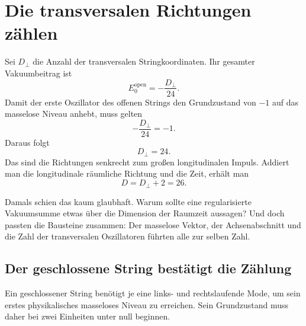 \section{Die transversalen Richtungen zählen}

Sei \(D_\perp\) die Anzahl der transversalen Stringkoordinaten. Ihr gesamter Vakuumbeitrag ist
\begin{equation}
  E_0^{\mathrm{open}}
  =-\frac{D_\perp}{24}.
  \label{eq:l05-open-vacuum}
\end{equation}
Damit der erste Oszillator des offenen Strings den Grundzustand von \(-1\) auf das masselose Niveau anhebt, muss gelten
\begin{equation}
  -\frac{D_\perp}{24}=-1.
\end{equation}
Daraus folgt
\begin{equation}
  D_\perp=24.
\end{equation}
Das sind die Richtungen senkrecht zum großen longitudinalen Impuls. Addiert man die longitudinale räumliche Richtung und die Zeit, erhält man
\begin{equation}
  D=D_\perp+2=26.
  \label{eq:l05-critical-dimension}
\end{equation}

\begin{classroomqa}\end{classroomqa}

Damals schien das kaum glaubhaft. Warum sollte eine regularisierte Vakuumsumme etwas über die Dimension der Raumzeit aussagen? Und doch passten die Bausteine zusammen: Der masselose Vektor, der Achsenabschnitt und die Zahl der transversalen Oszillatoren führten alle zur selben Zahl.

\subsection{Der geschlossene String bestätigt die Zählung}

Ein geschlossener String benötigt je eine links- und rechtslaufende Mode, um sein erstes physikalisches masseloses Niveau zu erreichen. Sein Grundzustand muss daher bei zwei Einheiten unter null beginnen.

